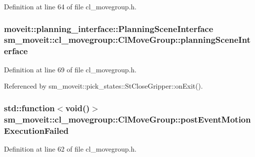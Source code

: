 Definition at line 64 of file cl\+\_\+movegroup.\+h.

\subsubsection[{\texorpdfstring{planning\+Scene\+Interface}{planningSceneInterface}}]{\setlength{\rightskip}{0pt plus 5cm}moveit\+::planning\+\_\+interface\+::\+Planning\+Scene\+Interface sm\+\_\+moveit\+::cl\+\_\+movegroup\+::\+Cl\+Move\+Group\+::planning\+Scene\+Interface}\hypertarget{classsm__moveit_1_1cl__movegroup_1_1ClMoveGroup_a26b5c9e0aef1cd67ee977a756b69cf76}{}\label{classsm__moveit_1_1cl__movegroup_1_1ClMoveGroup_a26b5c9e0aef1cd67ee977a756b69cf76}


Definition at line 69 of file cl\+\_\+movegroup.\+h.



Referenced by sm\+\_\+moveit\+::pick\+\_\+states\+::\+St\+Close\+Gripper\+::on\+Exit().

\subsubsection[{\texorpdfstring{post\+Event\+Motion\+Execution\+Failed}{postEventMotionExecutionFailed}}]{\setlength{\rightskip}{0pt plus 5cm}std\+::function$<$void()$>$ sm\+\_\+moveit\+::cl\+\_\+movegroup\+::\+Cl\+Move\+Group\+::post\+Event\+Motion\+Execution\+Failed\hspace{0.3cm}{\ttfamily [private]}}\hypertarget{classsm__moveit_1_1cl__movegroup_1_1ClMoveGroup_a742a3504755ab7bae290c87290d2bf3f}{}\label{classsm__moveit_1_1cl__movegroup_1_1ClMoveGroup_a742a3504755ab7bae290c87290d2bf3f}


Definition at line 62 of file cl\+\_\+movegroup.\+h.

